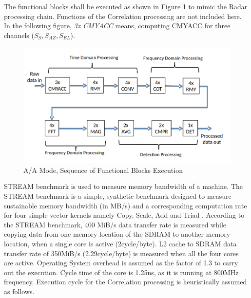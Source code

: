 The functional blocks shall be executed as shown in Figure \ref{fig:bg_related_work:aa_seq} to mimic the Radar processing chain. Functions of the Correlation processing are not included here. In the following figure, \textsl{3x CMYACC} means, computing \hyperlink{benchmarks}{CMYACC} for three channels ($S_{S},S_{AZ},S_{EL}$).

\begin{figure}[h!]
	\centering
	\includegraphics[width=160mm]{figures/aa_seq}
	\caption{A/A Mode, Sequence of Functional Blocks Execution}
	\label{fig:bg_related_work:aa_seq}
\end{figure}

STREAM benchmark\cite{McCalpin2007} is used to measure memory bandwidth of a machine. The STREAM benchmark is a simple, synthetic benchmark designed to measure sustainable memory bandwidth (in MB/s) and a corresponding computation rate for four simple vector kernels namely Copy, Scale, Add and Triad \cite{streamDef}. According to the STREAM benchmark, 400 MiB/s data transfer rate is measured while copying data from one memory location of the SDRAM to another memory location, when a single core is active (2cycle/byte). L2 cache to SDRAM data transfer rate of 350MiB/s (2.29cycle/byte) is measured when all the four cores are active. Operating System overhead is assumed as the factor of 1.3 to carry out the execution. Cycle time of the core is 1.25ns, as it is running at 800MHz frequency. Execution cycle for the Correlation processing is heuristically assumed as follows.



